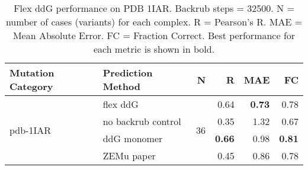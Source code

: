 \begin{table}
  \begin{tabular}{llrrrr}
\toprule
Mutation Category &   Prediction Method &   N &    R &  MAE &   FC \\
\midrule
 \multirow{ 4}{*}{pdb-1IAR} & flex ddG & \multirow{ 4}{*}{36} & 0.64 & \textbf{0.73} & 0.78  \\
 & no backrub control & & 0.35 & 1.32 & 0.67  \\
 & ddG monomer & & \textbf{0.66} & 0.98 & \textbf{0.81}  \\
 & ZEMu paper & & 0.45 & 0.86 & 0.78  \\
\bottomrule
\end{tabular}
  \caption[Flex ddG performance on PDB 1IAR]{
    Flex ddG performance on PDB 1IAR. Backrub steps = 32500. N = number of cases (variants) for each complex. R = Pearson's R. MAE = Mean Absolute Error. FC = Fraction Correct. Best performance for each metric is shown in bold.
  } \label{tab:table-pdb-1IAR}
\end{table}
